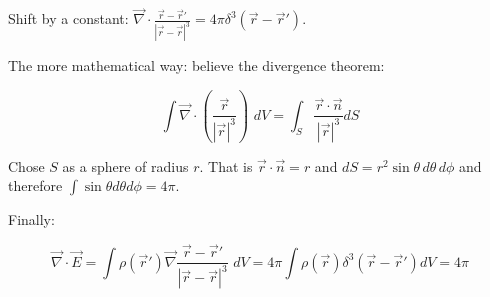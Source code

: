 Shift by a constant: $\vec{\nabla} \cdot \frac{\vec{r} - \vec{r}'}{|\vec{r} - \vec{r}|^3} = 4 \pi \delta^3 (\vec{r} - \vec{r}')$.

The more mathematical way: believe the divergence theorem:

$$\int \vec{\nabla} \cdot \left(\frac{\vec{r}}{|\vec{r}|^3}\right) \, \, dV = \int_S \frac{\vec{r} \cdot \vec{n}}{|\vec{r}|^3} dS$$

Chose $S$ as a sphere of radius $r$. That is $\vec{r} \cdot \vec{n} = r$ and $dS = r^2 \sin \theta \, d\theta \, d\phi$ and therefore $\int \sin \theta d\theta d\phi = 4 \pi$.

Finally:

$$\vec{\nabla} \cdot \vec{E} = \int \rho(\vec{r}') \vec{\nabla} \frac{\vec{r} - \vec{r}'}{|\vec{r} - \vec{r}|^3} \, \, dV = 4 \pi \int \rho (\vec{r}) \delta^3 (\vec{r} - \vec{r}') dV = 4 \pi$$